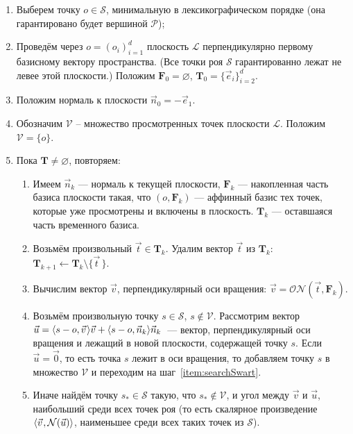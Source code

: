 \documentclass[a4paper,12pt]{article}
\newcommand{\Swarm}{\mathcal{S}}              %
\newcommand{\Polyhedron}{\mathcal{P}}         %
\newcommand{\Viewed}{\mathcal{V}}             %
\newcommand{\ZVec}{\vec 0}                    %
\newcommand{\set}[2][]{#1\{ #2 #1\}}                    %
\newcommand{\scalprod}[3][]{#1\langle #2, #3 #1\rangle} %
\newcommand{\Norm}[2][]{\mathcal{N}#1( #2 #1)} %
\newcommand{\ONorm}[3][]{\mathcal{ON}#1( #2, #3 #1)} %
\newcommand{\TempVec}{\mathbf{T}}  %
\newcommand{\FinalVec}{\mathbf{F}} %
\newcommand{\Plane}{\mathcal{L}}           %
\renewcommand{\.}{\hspace{0.2ex}}
\begin{document}
    \begin{enumerate}
      \item Выберем точку $o \in \Swarm$, минимальную в лексикографическом порядке (она гарантировано будет вершиной $\Polyhedron$);

      \item Проведём через $o=(o_i)_{i = 1}^{d}$ плоскость $\Plane$ перпендикулярно первому базисному вектору пространства. (Все точки роя $\Swarm$ гарантированно лежат не левее этой плоскости.) Положим $\FinalVec_0 = \varnothing$, $\TempVec_0 =  \set{\vec e_i}_{i=2}^d$.

      \item Положим нормаль к плоскости $\vec n_0 = -\vec e_1$.

      \item Обозначим $\Viewed$ -- множество просмотренных точек плоскости $\Plane$. Положим $\Viewed =\set{o}$.

      \item Пока $\TempVec \neq \varnothing$, повторяем:

      \begin{enumerate}
        \item Имеем $\vec n_k$ --- нормаль к текущей плоскости, $\FinalVec_k$ --- накопленная часть базиса плоскости такая, что $(o, \FinalVec_k)$ --- аффинный базис тех точек, которые уже просмотрены и включены в плоскость. $\TempVec_k$ --- оставшаяся часть временного базиса.

        \item Возьмём произвольный $\vec t \in \TempVec_k$. Удалим вектор $\vec t$ из $\TempVec_k$: $\TempVec_{k+1} \leftarrow \TempVec_k \setminus \set{\vec t \,}$.

        \item Вычислим вектор $\vec v$, перпендикулярный оси вращения: $\vec v = \ONorm{\vec t}{\FinalVec_k}$.

        \item Возьмём произвольную точку $s \in \Swarm$, $s \notin \Viewed$. Рассмотрим вектор $\vec u = \scalprod{s - o}{\vec v \.}\vec v + \scalprod{s - o}{\vec n_k}\vec n_k$~--- вектор, перпендикулярный оси вращения и лежащий в новой плоскости, содержащей точку $s$. Если $\vec u = \ZVec$, то есть точка $s$ лежит в оси вращения, то добавляем точку $s$ в множество $\Viewed$ и переходим на шаг~\ref{item:searchSwart}.
        \label{item:searchSwart}

        \item Иначе найдём точку $s_* \in \Swarm$ такую, что $s_* \notin \Viewed$, и угол между $\vec v$ и $\vec u$, наибольший среди всех точек роя (то есть скалярное произведение $\scalprod{\vec v \.}{\Norm{\vec u}}$, наименьшее среди всех таких точек из $\Swarm$).


\end{enumerate}
\end{enumerate}
\end{document}

